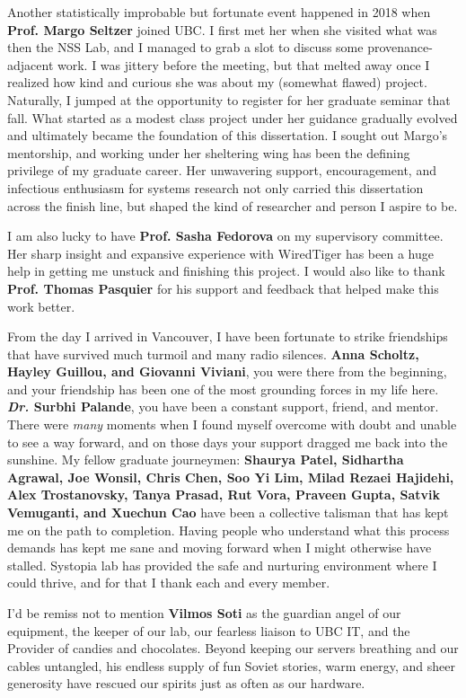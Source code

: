 Another statistically improbable but fortunate event happened in 2018 when \textbf{Prof. Margo Seltzer} joined UBC.
I first met her when she visited what was then the NSS Lab, and I managed to grab a slot to discuss some provenance-adjacent work.
I was jittery before the meeting, but that melted away once I realized how kind and curious she was about my (somewhat flawed) project.
Naturally, I jumped at the opportunity to register for her graduate seminar that fall.
What started as a modest class project under her guidance gradually evolved and ultimately became the foundation of this dissertation.
I sought out Margo's mentorship, and working under her sheltering wing has been the defining privilege of my graduate career.
Her unwavering support, encouragement, and infectious enthusiasm for systems research not only carried this dissertation across the finish line, but shaped the kind of researcher and person I aspire to be.

I am also lucky to have \textbf{Prof. Sasha Fedorova} on my supervisory committee.
Her sharp insight and expansive experience with WiredTiger has been a huge help in getting me unstuck and finishing this project.
I would also like to thank \textbf{Prof. Thomas Pasquier} for his support and feedback that helped make this work better.

From the day I arrived in Vancouver, I have been fortunate to strike friendships that have survived much turmoil and many radio silences.
\textbf{Anna Scholtz, Hayley Guillou, and Giovanni Viviani}, you were there from the beginning, and your friendship has been one of the most grounding forces in my life here.
\textbf{\emph{Dr.} Surbhi Palande}, you have been a constant support, friend, and mentor.
There were \emph{many} moments when I found myself overcome with doubt and unable to see a way forward, and on those days your support dragged me back into the sunshine.
My fellow graduate journeymen: \textbf{Shaurya Patel, Sidhartha Agrawal, Joe Wonsil, Chris Chen, Soo Yi Lim, Milad Rezaei Hajidehi, Alex Trostanovsky, Tanya Prasad, Rut Vora, Praveen Gupta, Satvik Vemuganti, and Xuechun Cao} have been a collective talisman that has kept me on the path to completion.
Having people who understand what this process demands has kept me sane and moving forward when I might otherwise have stalled.
Systopia lab has provided the safe and nurturing environment where I could thrive, and for that I thank each and every member.

I’d be remiss not to mention \textbf{Vilmos Soti} as the guardian angel of our equipment, the keeper of our lab, our fearless liaison to UBC IT, and the Provider of candies and chocolates.
Beyond keeping our servers breathing and our cables untangled, his endless supply of fun Soviet stories, warm energy, and sheer generosity have rescued our spirits just as often as our hardware.

